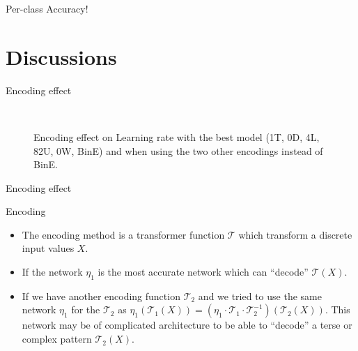 \begin{frame}[fragile]{Per-class Accuracy!}

\end{frame}

\section{Discussions}


\begin{frame}[fragile]{Encoding effect}
	\begin{figure}[!t]
		  \begin{tikzpicture}
		
		  \end{tikzpicture}
		\caption{Encoding effect on Learning rate with the best model (1T, 0D, 4L, 82U, 0W, BinE) and when using the two other encodings	instead of BinE.}~\label{Fig:ArabicModelsResults}

	\end{figure}

\end{frame}



\begin{frame}[fragile]{Encoding effect}

\begin{block}{Encoding}
	\begin{itemize}
		
		\item The encoding method is a transformer function $\mathcal{T}$ which transform a discrete input values $X$. 
		\item If the network $\eta_1$ is the most accurate network which can ``decode'' $\mathcal{T}(X)$. 
		\item If we have another encoding function $\mathcal{T}_2$ and we tried to use the same network $\eta_1$ for the $\mathcal{T}_2$ as $\eta_1\left(\mathcal{T}_1(X)\right) = \left(\eta_1\cdot\mathcal{T}_1\cdot \mathcal{T}_2^{-1} \right)\left(\mathcal{T}_2(X)\right)$. This network may be of complicated architecture to be able to “decode” a terse or complex pattern $\mathcal{T}_2(X)$.
		
		
	\end{itemize}

	
\end{block}

\end{frame}

